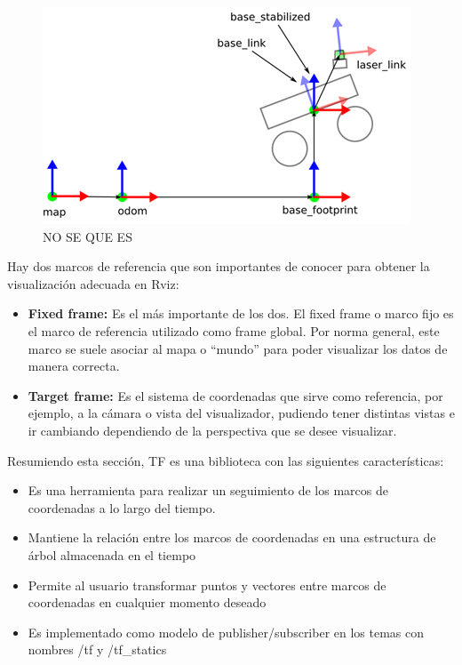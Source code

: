         \begin{figure}[htb]
            \centering
            \includegraphics[width=1.0\linewidth]{Main/Chapter3/Images3/3-6/nose2.png}
            \caption{NO SE QUE ES}
            \label{f:Cap3-6_NOSE_tf}
        \end{figure} 
        
        Hay dos marcos de referencia que son importantes de conocer para obtener la visualización adecuada en Rviz:
        
        \begin{itemize}
            \item \textbf{Fixed frame:} Es el más importante de los dos. El fixed frame o marco fijo es el marco de referencia utilizado como frame global. Por norma general, este marco se suele asociar al mapa o ``mundo'' para poder visualizar los datos de manera correcta.
            \item \textbf{Target frame:} Es el sistema de coordenadas que sirve como referencia, por ejemplo, a la cámara o vista del visualizador, pudiendo tener distintas vistas e ir cambiando dependiendo de la perspectiva que se desee visualizar.
        \end{itemize}
        
        Resumiendo esta sección, TF es una biblioteca con las siguientes características:
        
        \begin{itemize}
            \item Es una herramienta para realizar un seguimiento de los marcos de coordenadas a lo largo del tiempo.
            \item Mantiene la relación entre los marcos de coordenadas en una estructura de árbol almacenada en el tiempo
            \item Permite al usuario transformar puntos y vectores entre marcos de coordenadas en cualquier momento deseado
            \item Es implementado como modelo de publisher/subscriber en los temas con nombres /tf y /tf\_statics
        \end{itemize}
        
